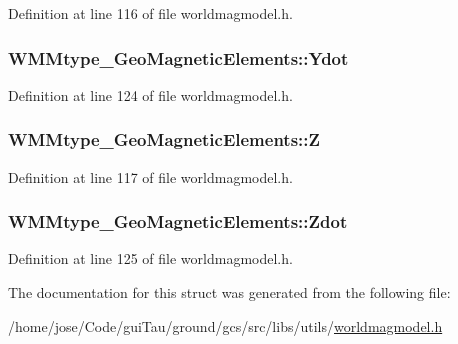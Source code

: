 Definition at line 116 of file worldmagmodel.\-h.

\hypertarget{struct_w_m_mtype___geo_magnetic_elements_aaecfb6ce93c718489c1d0982d43d56b6}{
\subsubsection[{Ydot}]{ W\-M\-Mtype\-\_\-\-Geo\-Magnetic\-Elements\-::\-Ydot}}\label{struct_w_m_mtype___geo_magnetic_elements_aaecfb6ce93c718489c1d0982d43d56b6}


Definition at line 124 of file worldmagmodel.\-h.

\hypertarget{struct_w_m_mtype___geo_magnetic_elements_a989cffa7f071bb16f17a2be007dd5419}{
\subsubsection[{Z}]{ W\-M\-Mtype\-\_\-\-Geo\-Magnetic\-Elements\-::\-Z}}\label{struct_w_m_mtype___geo_magnetic_elements_a989cffa7f071bb16f17a2be007dd5419}


Definition at line 117 of file worldmagmodel.\-h.

\hypertarget{struct_w_m_mtype___geo_magnetic_elements_a105c49de1702144d115e20ba6272a2c6}{
\subsubsection[{Zdot}]{ W\-M\-Mtype\-\_\-\-Geo\-Magnetic\-Elements\-::\-Zdot}}\label{struct_w_m_mtype___geo_magnetic_elements_a105c49de1702144d115e20ba6272a2c6}


Definition at line 125 of file worldmagmodel.\-h.



The documentation for this struct was generated from the following file\-:\begin{DoxyCompactItemize}
\item 
/home/jose/\-Code/gui\-Tau/ground/gcs/src/libs/utils/\hyperlink{worldmagmodel_8h}{worldmagmodel.\-h}\end{DoxyCompactItemize}
